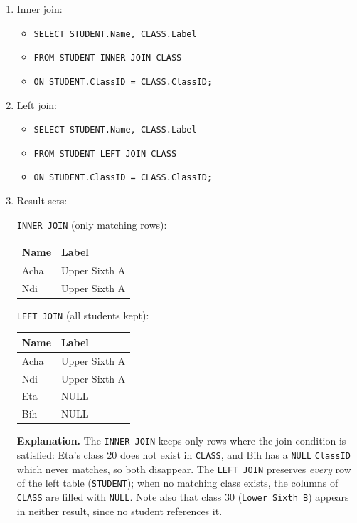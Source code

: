 \documentclass[11pt]{article}
\begin{document}
\begin{corrige}
\begin{enumerate}
\item Inner join:
\begin{itemize}
\item \texttt{SELECT STUDENT.Name, CLASS.Label}
\item \texttt{FROM STUDENT INNER JOIN CLASS}
\item \texttt{ON STUDENT.ClassID = CLASS.ClassID;}
\end{itemize}
\item Left join:
\begin{itemize}
\item \texttt{SELECT STUDENT.Name, CLASS.Label}
\item \texttt{FROM STUDENT LEFT JOIN CLASS}
\item \texttt{ON STUDENT.ClassID = CLASS.ClassID;}
\end{itemize}
\item Result sets:

\texttt{INNER JOIN} (only matching rows):
\begin{center}
\begin{tabular}{|l|l|}
\hline
\rowcolor{popblueL} \textbf{Name} & \textbf{Label} \\
\hline
Acha & Upper Sixth A \\
\hline
Ndi & Upper Sixth A \\
\hline
\end{tabular}
\end{center}

\texttt{LEFT JOIN} (all students kept):
\begin{center}
\begin{tabular}{|l|l|}
\hline
\rowcolor{popblueL} \textbf{Name} & \textbf{Label} \\
\hline
Acha & Upper Sixth A \\
\hline
Ndi & Upper Sixth A \\
\hline
Eta & NULL \\
\hline
Bih & NULL \\
\hline
\end{tabular}
\end{center}

\textbf{Explanation.} The \texttt{INNER JOIN} keeps only rows where the join condition is satisfied: Eta's class 20 does not exist in \texttt{CLASS}, and Bih has a \texttt{NULL} \texttt{ClassID} which never matches, so both disappear. The \texttt{LEFT JOIN} preserves \emph{every} row of the left table (\texttt{STUDENT}); when no matching class exists, the columns of \texttt{CLASS} are filled with \texttt{NULL}. Note also that class 30 (\texttt{Lower Sixth B}) appears in neither result, since no student references it.
\end{enumerate}
\end{corrige}
\end{document}
